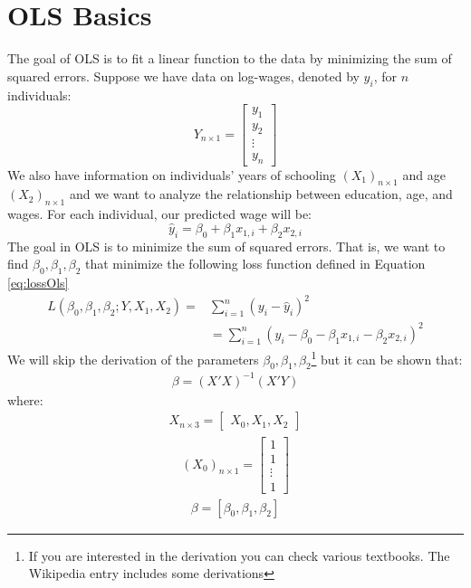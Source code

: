 \documentclass[11pt,letterpaper]{article}
\begin{document}
\section{OLS Basics}
The goal of OLS is to fit a linear function to the data by minimizing the sum of squared errors. Suppose we have data on log-wages, denoted by $y_i$, for $n$ individuals:
\begin{equation}
    Y_{n\times 1}=\begin{bmatrix} y_1\\ y_2 \\ \vdots \\ y_n \end{bmatrix}
\end{equation}
We also have information on individuals' years of schooling $(X_1)_{n\times1}$ and age $(X_2)_{n\times1}$ and we want to analyze the relationship between education, age, and wages. For each individual, our predicted wage  will be:
\begin{equation}
    \hat y_i=\beta_0+\beta_1x_{1,i}+\beta_2 x_{2,i}
\end{equation}
The goal in OLS is to minimize the sum of squared errors. That is, we want to find $\beta_0,\beta_1,\beta_2$ that minimize the following loss function defined in Equation \ref{eq:lossOls}
\begin{align}\label{eq:lossOls}
    L(\beta_0,\beta_1,\beta_2;Y,X_1,X_2)= & \sum_{i=1}^n\left(y_i-\hat y_i\right)^2\nonumber \\[0.2in]
    & = \sum_{i=1}^n\left(y_i-\beta_0-\beta_1x_{1,i}-\beta_2 x_{2,i}\right)^2
\end{align}
We will skip the derivation of the parameters $\beta_0,\beta_1,\beta_2$\footnote{If you are interested in the derivation you can check various textbooks. The Wikipedia entry includes some derivations} but it can be shown that:
\begin{align}
    \beta=\left(X'X\right)^{-1}\left(X'Y\right)
\end{align}
where:
\begin{align}
    X_{n\times 3}=\begin{bmatrix}X_0,X_1,X_2\end{bmatrix}
\end{align}
\begin{align}
    (X_0)_{n\times 1}=\begin{bmatrix}1\\ 1\\ \vdots \\1\end{bmatrix}
\end{align}
\begin{align}
    \beta=\left[\beta_0,\beta_1,\beta_2\right]
\end{align}
\end{document}
